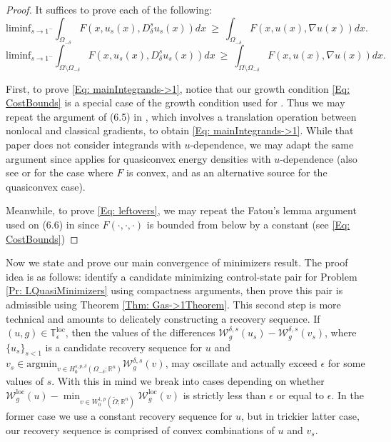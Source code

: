 \documentclass[11pt, reqno]{amsart}   	%
\theoremstyle{plain}
\numberwithin{equation}{section}
\def\de{\delta}
\def\ep{\epsilon}
\def\Om{\Omega}
\def\R{\mathbb{R}}
\def\grad{\nabla}
\def\argmin{\text{argmin}}
\def\liminf{\text{liminf}}
\def\loc{\text{loc}}
\begin{document}
\begin{proof}
    It suffices to prove each of the following:
    \begin{equation}\label{Eq: mainIntegrands->1}
        \liminf_{s \rightarrow 1^-}\int_{\Om_{-\de}}F(x, u_s(x), D^s_{\de}u_s(x))dx \ \geq \ \int_{\Om_{-\de}}F(x, u(x), \grad u(x))dx.
    \end{equation}
    \begin{equation}\label{Eq: leftovers}
        \liminf_{s \rightarrow 1^-}\int_{\Om\setminus \Om_{-\de}}F(x, u_s(x), D^s_{\de}u_s(x))dx \ \geq \ \int_{\Om\setminus \Om_{-\de}}F(x, u(x), \grad u(x))dx.
    \end{equation}

First, to prove \eqref{Eq: mainIntegrands->1}, notice that our growth condition \eqref{Eq: CostBounds} is a special case of the growth condition used for \cite[Theorem 8.11]{dacorogna2007direct}. Thus we may repeat the argument of (6.5) in \cite{cueto2023variational}, which involves a translation operation between nonlocal and classical gradients, to obtain \eqref{Eq: mainIntegrands->1}. While that paper does not consider integrands with $u$-dependence, we may adapt the same argument since \cite[Theorem 8.11]{dacorogna2007direct}  applies for quasiconvex energy densities with $u$-dependence (also see \cite[Theorem 7.5]{fonseca2007modern} or \cite[Theorem 5.4]{ball1981null} for the case where $F$ is convex, and  \cite[Theorem 5.20]{Rin} as an alternative source for the quasiconvex case).
    
    Meanwhile, to prove \eqref{Eq: leftovers}, we may repeat the Fatou's lemma argument used on (6.6) in \cite{cueto2023variational} since $F(\cdot, \cdot, \cdot)$ is bounded from below by a constant (see \eqref{Eq: CostBounds})

\end{proof}

Now we state and prove our main convergence of minimizers result. The proof idea is as follows: identify a candidate minimizing control-state pair for Problem \ref{Pr: LQuasiMinimizers} using compactness arguments, then prove this pair is admissible using Theorem \ref{Thm: Gas->1Theorem}. This second step is more technical and amounts to delicately constructing a recovery sequence. If $(u, g) \in \mathbb{T}^{\loc}_{\ep}$, then the values of the differences $\mathcal{W}^{\de, s}_g(u_s) - \mathcal{W}^{\de, s}_g(v_s)$, where $\{u_s\}_{s < 1}$ is a candidate recovery sequence for $u$ and $v_s \in \argmin_{v \in H^{s, p, \de}_0(\Om_{-\de}; \R^n)}\mathcal{W}^{\de, s}_g(v)$, may oscillate and actually exceed $\ep$ for some values of $s$. With this in mind we break into cases depending on whether $\mathcal{W}^{\loc}_g(u) - \min_{v \in W^{1, p}_0(\widetilde{\Om}; \R^n)}\mathcal{W}^{\loc}_g(v)$ is strictly less than $\ep$ or equal to $\ep$. In the former case we use a constant recovery sequence for $u$, but in trickier latter case, our recovery sequence is comprised of convex combinations of $u$ and $v_s$.
\end{document}
